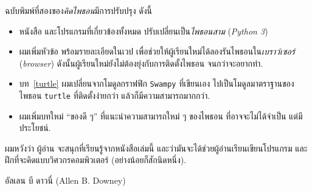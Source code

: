 ฉบับพิมพ์ที่สองของ\textit{คิดไพธอน}มีการปรับปรุง ดังนี้

\begin{itemize}


\item หนังสือ และโปรแกรมที่เกี่ยวข้องทั้งหมด ปรับเปลี่ยนเป็น\textit{ไพธอนสาม} (\textit{Python 3})


\item ผมเพิ่มหัวข้อ พร้อมรายละเอียดในเวป 
เพื่อช่วยให้ผู้เรียนใหม่ได้ลองรันไพธอนใน\textit{เบราว์เซอร์} (\textit{browser})
ดังนั้นผู้เรียนใหม่ยังไม่ต้องยุ่งกับการติดตั้งไพธอน จนกว่าจะอยากทำ.


\item บท~\ref{turtle} ผมเปลี่ยนจากโมดูลกราฟฟิก \texttt{Swampy} ที่เขียนเอง ไปเป็นโมดูลมาตราฐานของไพธอน \texttt{turtle}
ที่ติดตั้งง่ายกว่า แล้วก็มีความสามารถมากกว่า.


\item ผมเพิ่มบทใหม่ ``ของดี ๆ'' ที่แนะนำความสามารถใหม่ ๆ ของไพธอน
ที่อาจจะไม่ได้จำเป็น แต่มีประโยชน์.

\end{itemize}


ผมหวังว่า ผู้อ่าน จะสนุกที่เรียนรู้จากหนังสือเล่มนี้
และว่ามันจะได้ช่วยผู้อ่านเรียนเขียนโปรแกรม 
และฝึกที่จะคิดแบบวิศวกรคอมพิวเตอร์ (อย่างน้อยก็สักนิดหนึ่ง).

\hfill อัลเลน บี ดาวนี่ (Allen B. Downey)

